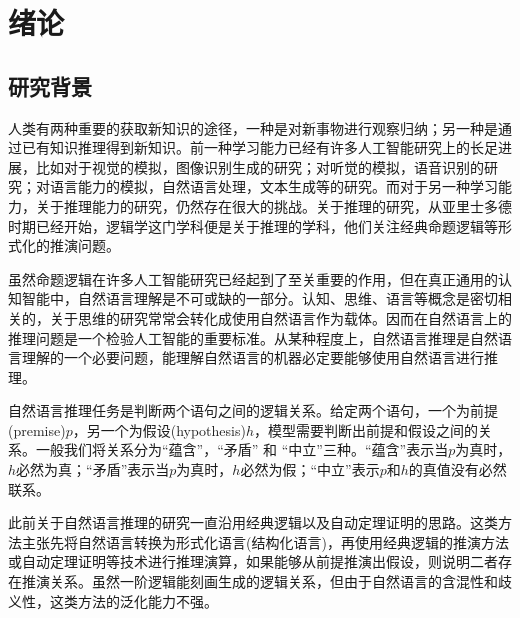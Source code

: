 \documentclass[UTF8,11pt,a4paper,nofonts]{ctexart}
\begin{document}
\newpage
\thispagestyle{empty}
\newpage
\tableofcontents
\thispagestyle{empty}

\newpage



\section{绪论}

\subsection{研究背景}
\par


人类有两种重要的获取新知识的途径，一种是对新事物进行观察归纳；另一种是通过已有知识推理得到新知识。前一种学习能力已经有许多人工智能研究上的长足进展，比如对于视觉的模拟，图像识别生成的研究\cite{He2016DeepRL}；对听觉的模拟，语音识别的研究\cite{Chan2016ListenAA}；对语言能力的模拟，自然语言处理，文本生成等的研究\cite{Bahdanau2014NeuralMT, Vinyals2015ANC}。而对于另一种学习能力，关于推理能力的研究，仍然存在很大的挑战。关于推理的研究，从亚里士多德时期已经开始，逻辑学这门学科便是关于推理的学科，他们关注经典命题逻辑等形式化的推演问题。

虽然命题逻辑在许多人工智能研究已经起到了至关重要的作用，但在真正通用的认知智能中，自然语言理解是不可或缺的一部分。认知、思维、语言等概念是密切相关的，关于思维的研究常常会转化成使用自然语言作为载体。因而在自然语言上的推理问题是一个检验人工智能的重要标准。从某种程度上，自然语言推理是自然语言理解的一个必要问题，能理解自然语言的机器必定要能够使用自然语言进行推理。

自然语言推理任务是判断两个语句之间的逻辑关系。给定两个语句，一个为前提 (premise)$p$，另一个为假设(hypothesis)$h$，模型需要判断出前提和假设之间的关系。一般我们将关系分为“蕴含”，“矛盾” 和 “中立”三种。“蕴含”表示当$p$为真时，$h$必然为真；“矛盾”表示当$p$为真时，$h$必然为假；“中立”表示$p$和$h$的真值没有必然联系。





此前关于自然语言推理的研究一直沿用经典逻辑以及自动定理证明的思路。这类方法主张先将自然语言转换为形式化语言(结构化语言)，再使用经典逻辑的推演方法或自动定理证明等技术进行推理演算，如果能够从前提推演出假设，则说明二者存在推演关系。虽然一阶逻辑能刻画生成的逻辑关系，但由于自然语言的含混性和歧义性，这类方法的泛化能力不强。
\end{document}
